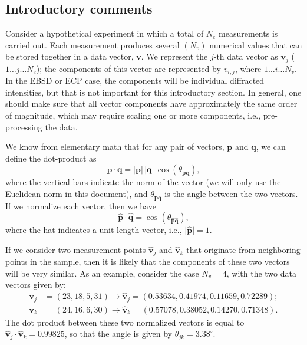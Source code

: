 \documentclass[DIV=calc, paper=letter, fontsize=11pt]{scrartcl}	 %
\begin{document}
\subsection{Introductory comments}
Consider a hypothetical experiment in which a total of $N_e$ measurements is carried out.
Each measurement produces several $(N_v)$ numerical values that can be stored together in a
data vector, $\mathbf{v}$.  We represent the $j$-th data vector as $\mathbf{v}_{j}$ ($1\ldots j\ldots N_e$); the components
of this vector are represented by $v_{i,j}$, where $1\ldots i\ldots N_v$.  In the EBSD or ECP case,
the components will be individual diffracted intensities, but that is not important for this introductory
section.  In general, one should make sure that all vector components have approximately the same 
order of magnitude, which may require scaling one or more components, i.e., pre-processing the data.

We know from elementary math that for any pair of vectors, $\mathbf{p}$ and $\mathbf{q}$, we can define the 
dot-product as
\begin{equation}
	\mathbf{p}\cdot\mathbf{q} = \vert\mathbf{p}\vert\,\vert\mathbf{q}\vert\,\cos(\theta_{\mathbf{p}\mathbf{q}}),
\end{equation}
where the vertical bars indicate the norm of the vector (we will only use the Euclidean norm in this document),
and $\theta_{\mathbf{p}\mathbf{q}}$ is the angle between the two vectors.  If we normalize each vector, then we have
\begin{equation}
	\hat{\mathbf{p}}\cdot\hat{\mathbf{q}} = \cos(\theta_{\hat{\mathbf{p}}\hat{\mathbf{q}}}),
\end{equation}
where the hat indicates a unit length vector, i.e., $\vert\hat{\mathbf{p}}\vert = 1$. 

If we consider two measurement points $\hat{\mathbf{v}}_j$ and $\hat{\mathbf{v}}_k$ that originate from neighboring 
points in the sample, then it is likely that the components of these two vectors will be very similar.  As an example,
consider the case $N_v=4$, with the two data vectors given by:
\begin{align*}
	\mathbf{v}_j &= (23, 18, 5, 31) \rightarrow \hat{\mathbf{v}}_j = (0.53634,      0.41974,      0.11659,      0.72289);\\
	\mathbf{v}_k &= (24, 16, 6, 30) \rightarrow \hat{\mathbf{v}}_k = (0.57078,      0.38052,      0.14270,      0.71348).
\end{align*}
The dot product between these two normalized vectors is equal to $\hat{\mathbf{v}}_j\cdot\hat{\mathbf{v}}_k=0.99825$, so that the 
angle is given by $\theta_{jk} = 3.38^{\circ}$.
\end{document}
